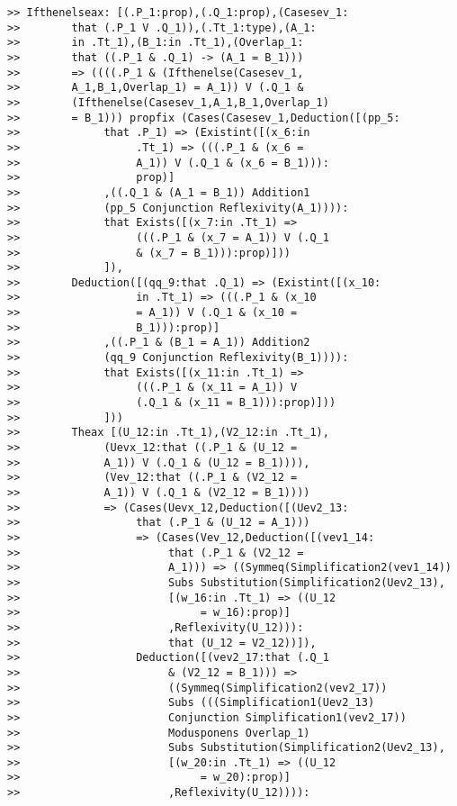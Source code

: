 \documentclass[12pt]{article}
\begin{document}
\begin{verbatim}
>> Ifthenelseax: [(.P_1:prop),(.Q_1:prop),(Casesev_1:
>>        that (.P_1 V .Q_1)),(.Tt_1:type),(A_1:
>>        in .Tt_1),(B_1:in .Tt_1),(Overlap_1:
>>        that ((.P_1 & .Q_1) -> (A_1 = B_1))) 
>>        => ((((.P_1 & (Ifthenelse(Casesev_1,
>>        A_1,B_1,Overlap_1) = A_1)) V (.Q_1 & 
>>        (Ifthenelse(Casesev_1,A_1,B_1,Overlap_1) 
>>        = B_1))) propfix (Cases(Casesev_1,Deduction([(pp_5:
>>             that .P_1) => (Existint([(x_6:in 
>>                  .Tt_1) => (((.P_1 & (x_6 = 
>>                  A_1)) V (.Q_1 & (x_6 = B_1))):
>>                  prop)]
>>             ,((.Q_1 & (A_1 = B_1)) Addition1 
>>             (pp_5 Conjunction Reflexivity(A_1)))):
>>             that Exists([(x_7:in .Tt_1) => 
>>                  (((.P_1 & (x_7 = A_1)) V (.Q_1 
>>                  & (x_7 = B_1))):prop)]))
>>             ]),
>>        Deduction([(qq_9:that .Q_1) => (Existint([(x_10:
>>                  in .Tt_1) => (((.P_1 & (x_10 
>>                  = A_1)) V (.Q_1 & (x_10 = 
>>                  B_1))):prop)]
>>             ,((.P_1 & (B_1 = A_1)) Addition2 
>>             (qq_9 Conjunction Reflexivity(B_1)))):
>>             that Exists([(x_11:in .Tt_1) => 
>>                  (((.P_1 & (x_11 = A_1)) V 
>>                  (.Q_1 & (x_11 = B_1))):prop)]))
>>             ]))
>>        Theax [(U_12:in .Tt_1),(V2_12:in .Tt_1),
>>             (Uevx_12:that ((.P_1 & (U_12 = 
>>             A_1)) V (.Q_1 & (U_12 = B_1)))),
>>             (Vev_12:that ((.P_1 & (V2_12 = 
>>             A_1)) V (.Q_1 & (V2_12 = B_1)))) 
>>             => (Cases(Uevx_12,Deduction([(Uev2_13:
>>                  that (.P_1 & (U_12 = A_1))) 
>>                  => (Cases(Vev_12,Deduction([(vev1_14:
>>                       that (.P_1 & (V2_12 = 
>>                       A_1))) => ((Symmeq(Simplification2(vev1_14)) 
>>                       Subs Substitution(Simplification2(Uev2_13),
>>                       [(w_16:in .Tt_1) => ((U_12 
>>                            = w_16):prop)]
>>                       ,Reflexivity(U_12))):
>>                       that (U_12 = V2_12))]),
>>                  Deduction([(vev2_17:that (.Q_1 
>>                       & (V2_12 = B_1))) => 
>>                       ((Symmeq(Simplification2(vev2_17)) 
>>                       Subs (((Simplification1(Uev2_13) 
>>                       Conjunction Simplification1(vev2_17)) 
>>                       Modusponens Overlap_1) 
>>                       Subs Substitution(Simplification2(Uev2_13),
>>                       [(w_20:in .Tt_1) => ((U_12 
>>                            = w_20):prop)]
>>                       ,Reflexivity(U_12)))):

\end{verbatim}
\end{document}
